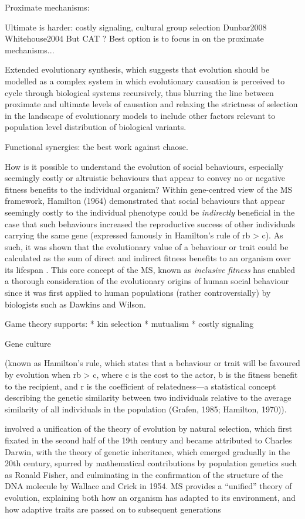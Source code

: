 Proximate mechanisms:

Ultimate is harder:
costly signaling,
cultural group selection
    Dunbar2008
    Whitehouse2004
But CAT ?
Best option is to focus in on the proximate mechanisms...



Extended evolutionary synthesis,
which suggests that evolution should be modelled as a complex system in which evolutionary causation is perceived to cycle through biological systems recursively, thus blurring the line between proximate and ultimate levels of causation and relaxing the strictness of selection in the landscape of evolutionary models to include other factors relevant to population level distribution of biological variants.

Functional synergies: the best work against chaose.

How is it possible to understand the evolution of social behaviours, especially seemingly costly or altruistic behaviours that appear to convey no or negative fitness benefits to the individual organism? Within gene-centred view of the MS framework, Hamilton (1964) demonstrated that social behaviours that appear seemingly costly to the individual phenotype could be \textit{indirectly} beneficial in the case that such behaviours increased the reproductive success of other individuals carrying the same gene (expressed famously in Hamilton’s rule of rb > c).  As such, it was shown that the evolutionary value of a behaviour or trait could be calculated as the sum of direct and indirect fitness benefits to an organism over its lifespan \citep{Grafen2006}.  This core concept of the MS, known as \textit{inclusive fitness} has enabled a thorough consideration of the evolutionary origins of human social behaviour since it was first applied to human populations (rather controversially) by biologists such as Dawkins and Wilson.

Game theory supports:
* kin selection
* mutualism
* costly signaling


Gene culture

(known as Hamilton’s rule, which states that a behaviour or trait will be favoured by evolution when rb > c, where c is the cost to the actor, b is the fitness benefit to the recipient, and r is the coefficient of relatedness—a statistical concept describing the genetic similarity between two individuals relative to the average similarity of all individuals in the population (Grafen, 1985; Hamilton, 1970)).

involved a unification of the theory of evolution by natural selection, which first fixated in the second half of the 19th century and became attributed to Charles Darwin, with the theory of genetic inheritance, which emerged gradually in the 20th century, spurred by mathematical contributions by population genetics such as Ronald Fisher, and culminating in the confirmation of the structure of the DNA molecule by Wallace and Crick in 1954.  MS provides a ``unified'' theory of evolution, explaining both how an organism has adapted to its environment, and how adaptive traits are passed on to subsequent generations




